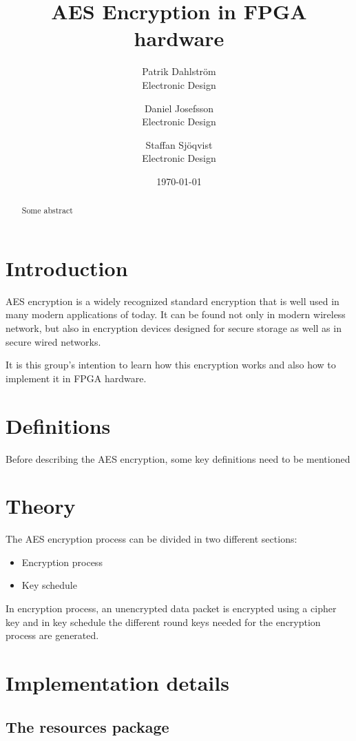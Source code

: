 \documentclass[12pt]{report}
\title{AES Encryption in FPGA hardware}
\author{
        Patrik Dahlström \\
        Electronic Design\\
            \and
        Daniel Josefsson\\
        Electronic Design\\
            \and
        Staffan Sjöqvist\\
        Electronic Design
}
\date{\today}
\begin{document}
\maketitle

\begin{abstract}
Some abstract
\end{abstract}

\pagebreak

\chapter{Introduction}
AES encryption is a widely recognized standard encryption that is well used in many modern applications of today. It can be found not only in modern wireless network, but also in encryption devices designed for secure storage as well as in secure wired networks.

It is this group's intention to learn how this encryption works and also how to implement it in FPGA hardware.

\chapter{Definitions}
Before describing the AES encryption, some key definitions need to be mentioned



\chapter{Theory} \label{sec:theory}
The AES encryption process can be divided in two different sections:
\begin{itemize}
\item Encryption process
\item Key schedule
\end{itemize}
In encryption process, an unencrypted data packet is encrypted using a cipher key and in key schedule the different round keys needed for the encryption process are generated.





\chapter{Implementation details}

\section{The resources package}
\end{document}
